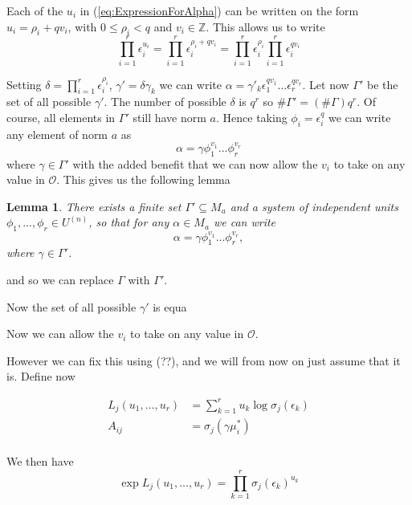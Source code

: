 \documentclass{article}
\newtheorem{lemma}{Lemma}[section]
\newcommand{\mcal}[1]{\mathcal{#1}}
\newcommand{\mbb}[1]{\mathbb{#1}}
\begin{document}
Each of the $u_i$ in (\ref{eq:ExpressionForAlpha}) can be written on the form $u_i = \rho_i + qv_i$, with $0 \leq \rho_i < q$ and $v_i \in \mbb{Z}$. This allows us to write 
$$\prod_{i=1}^r \epsilon_i^{u_i} = \prod_{i=1}^r \epsilon_i^{\rho_i + qv_i} = \prod_{i=1}^r \epsilon_i^{\rho_i} \prod_{i=1}^r \epsilon_i^{qv_i}$$ 

Setting $\delta = \prod_{i=1}^r \epsilon_i^{\rho_i}$, $\gamma' = \delta \gamma_k$ we can write $\alpha = \gamma'_k \epsilon_1^{qv_1}...\epsilon_r^{qv_r}$. Let now $\Gamma'$ be the set of all possible $\gamma'$. The number of possible $\delta$ is $q^r$ so $\# \Gamma' = (\# \Gamma) q^r$. Of course, all elements in $\Gamma'$ still have norm $a$. Hence taking $\phi_i = \epsilon_i^q$ we can write any element of norm $a$ as 
$$\alpha = \gamma \phi_1^{v_1}...\phi_r^{v_r}$$
where $\gamma \in \Gamma'$ with the added benefit that we can now allow the $v_i$ to take on any value in $\mcal O$.
This gives us the following lemma

\begin{lemma}
    There exists a finite set $\Gamma' \subseteq M_a$ and a system of independent units $\phi_1, ..., \phi_r \in U^{(n)}$, so that for any $\alpha \in M_a$ we can write $$\alpha = \gamma \phi_1^{v_1}...\phi_r^{v_r},$$ where $\gamma \in \Gamma'$.
\end{lemma}


and so we can replace $\Gamma$ with $\Gamma'$.


Now the set of all possible $\gamma'$ is equa


Now we can allow the $v_i$ to take on any value in $\mcal O$.



However we can fix this using (??), and we will from now on just assume that it is. Define now

\begin{align*}
    L_j(u_1, ..., u_r) &= \sum_{k = 1}^{r} u_k \log \sigma_j(\epsilon_k) \\
    A_{ij} &= \sigma_j(\gamma \mu_i^*) \\ 
\end{align*}

We then have 
$$\exp L_j (u_1, ..., u_r) = \prod_{k=1}^r \sigma_j(\epsilon_k)^{u_k}$$
\end{document}
